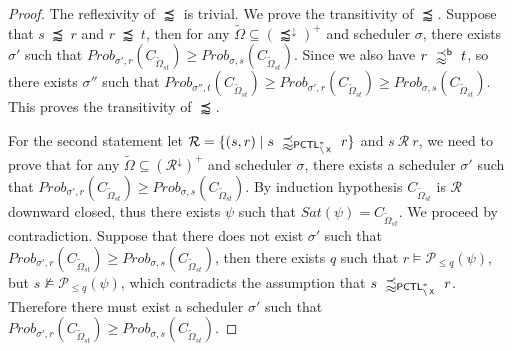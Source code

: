 \documentclass{LMCS}
\DeclareMathOperator{\X}{\text{\sf X}}
\newcommand{\WSi}{\precapprox}
\newcommand{\PCTL}{{\sf PCTL}}
\newcommand{\MC}[1]{\mathcal{#1}}
\newcommand{\MI}[1]{\mathit{#1}}
\newcommand{\SEPCTLSWN}{\precapprox_{\PCTL^{*}_{\backslash\X}}}
\newcommand{\WBSi}{\precapprox^{{\sf b}}}
\newcommand{\MEASURE}{\mathit{Prob}}
\newcommand{\DOWNWARD}[2]{#1^{\downarrow}#2}
\begin{document}
\begin{proof}
  The reflexivity of $\WSi$ is trivial. We prove the transitivity of
  $\WSi$. Suppose that $s~\WSi~r$ and $r~\WSi~t$, then for any
  $\widetilde{\Omega}\subseteq(\DOWNWARD{\WSi}{})^+$ and scheduler
  $\sigma$, there exists $\sigma'$ such that
  $\MEASURE_{\sigma',r}(C_{\widetilde{\Omega}_{\MI{st}}})\geq\MEASURE_{\sigma,s}(C_{\widetilde{\Omega}_{\MI{st}}})$. Since
  we also have $r~\WBSi~t$, so there exists $\sigma''$ such that
  $\MEASURE_{\sigma'',t}(C_{\widetilde{\Omega}_{\MI{st}}})\geq\MEASURE_{\sigma',r}(C_{\widetilde{\Omega}_{\MI{st}}})\geq\MEASURE_{\sigma,s}(C_{\widetilde{\Omega}_{\MI{st}}})$. This
  proves the transitivity of $\WSi$.

  For the second statement let $\MC{R}=\{(s,r)\mid s~\SEPCTLSWN~r\}$ and
  $s~\MC{R}~r$, we need to prove that for any
  $\widetilde{\Omega}\subseteq(\DOWNWARD{\MC{R}}{})^+$ and scheduler
  $\sigma$, there exists a scheduler $\sigma'$ such that
  $\MEASURE_{\sigma',r}(C_{\widetilde{\Omega}_{\mathit{st}}})\geq\MEASURE_{\sigma,s}(C_{\widetilde{\Omega}_{\mathit{st}}})$. By
  induction hypothesis $C_{\widetilde{\Omega}_{\mathit{st}}}$ is
  $\MC{R}$ downward closed, thus there exists $\psi$ such that
  $\MI{Sat}(\psi)=C_{\widetilde{\Omega}_{\mathit{st}}}$. We proceed by
  contradiction. Suppose that there does not exist $\sigma'$ such that
  $\MEASURE_{\sigma',r}(C_{\widetilde{\Omega}_{\mathit{st}}})\geq\MEASURE_{\sigma,s}(C_{\widetilde{\Omega}_{\mathit{st}}})$,
  then there exists $q$ such that $r\models\MC{P}_{\leq q}(\psi)$, but
  $s\not\models\MC{P}_{\leq q}(\psi)$, which contradicts the
  assumption that $s~\SEPCTLSWN~r$. Therefore there must exist a
  scheduler $\sigma'$ such that
  $\MEASURE_{\sigma',r}(C_{\widetilde{\Omega}_{\mathit{st}}})\geq\MEASURE_{\sigma,s}(C_{\widetilde{\Omega}_{\mathit{st}}})$.


\end{proof}
\end{document}
